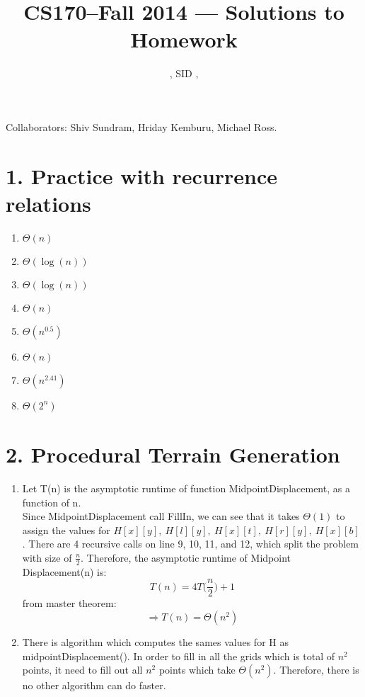\documentclass[11pt]{article}
\title{CS170--Fall 2014 --- Solutions to Homework \Homework}
\author{\Name, SID \SID, \texttt{\Login}}
\newenvironment{qparts}{\begin{enumerate}[{(}a{)}]}{\end{enumerate}}
\begin{document}
\maketitle

\noindent
Collaborators: Shiv Sundram, Hriday Kemburu, Michael Ross.


\section*{1. Practice with recurrence relations}
\begin{qparts}
\Large{}
\item
$\Theta(n)$

\item
$\Theta(\log(n))$

\item
$\Theta(\log(n))$

\item
$\Theta(n)$

\item
$\Theta(n^{0.5})$

\item
$\Theta(n)$

\item
$\Theta(n^{2.41})$

\item
$\Theta(2^n)$

\end{qparts}

\newpage
\section*{2.  Procedural Terrain Generation}
\begin{qparts}
\item
\Large{}
Let T(n) is the asymptotic runtime of function MidpointDisplacement, as a function of n.
\\
Since MidpointDisplacement call FillIn, we can see that it takes $\Theta(1)$ to assign the values for $H[x][y],\ H[l][y],\ H[x][t],\ H[r][y],\ H[x][b]$. There are 4 recursive calls on line 9, 10, 11, and 12, which split the problem with size of $\frac{n}{2}$. Therefore, the asymptotic runtime of Midpoint Displacement(n) is:
$$T(n) = 4T\Big(\frac{n}{2}\Big) + 1$$
from master theorem:
$$\Longrightarrow \boxed{T(n)= \Theta(n^2)}$$
\item
There is  algorithm which computes the sames values for H as midpointDisplacement(). In order to fill in all the grids which is total of $n^2$ points, it need to fill out all $n^2$ points which take $\Theta(n^2)$. Therefore, there is no other algorithm can do faster. 

\end{qparts}
\end{document}
